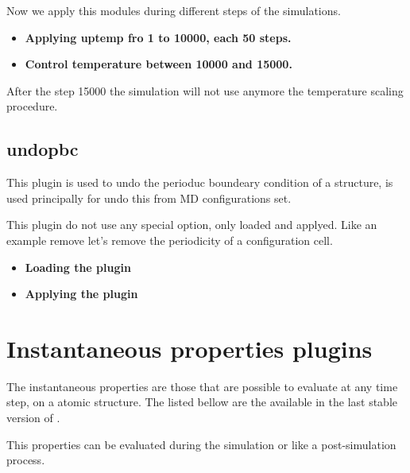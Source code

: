 Now we apply this modules during different steps of the simulations.

\begin{itemize}
 \item \textbf{Applying \textbf{uptemp} fro 1 to 10000, each 50 steps.}
 \item \textbf{Control temperature between 10000 and 15000.}
\end{itemize}

After the step 15000 the simulation will not use anymore the temperature
scaling procedure.

\subsection{undopbc}
This plugin is used to undo the perioduc boundeary condition of a structure, is
used principally for undo this from MD configurations set.

This plugin do not use any special option, only loaded and applyed. Like an
example remove let's remove the periodicity of a configuration cell.

\begin{itemize}
 \item \textbf{Loading the plugin}
 \item \textbf{Applying the plugin}
\end{itemize}


\section{Instantaneous properties plugins}

The instantaneous properties are those that are possible to evaluate at any
time step, on a atomic structure. The listed bellow are the available in the
last stable version of {\lpmd}.

This properties can be evaluated during the simulation or like a
post-simulation process.

